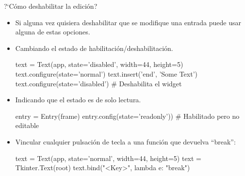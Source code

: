 \documentclass[10pt, envcountsect , spanish]{beamer}
\begin{document}
\begin{frame}[fragile]{?`Cómo deshabilitar la edición?}
\begin{itemize}
\item Si alguna vez quisiera deshabilitar que se modifique una entrada puede usar alguna de estas opciones.

\item Cambiando el estado de habilitación/deshabilitación.
\begin{pyverbatim}[][frame=single]
text = Text(app, state='disabled', width=44, height=5)
text.configure(state='normal')
text.insert('end', 'Some Text')
text.configure(state='disabled') # Deshabilita el widget
\end{pyverbatim}

\item Indicando que el estado es de solo lectura.
\begin{pyverbatim}[][frame=single]
entry = Entry(frame)
entry.config(state='readonly')) # Habilitado pero no editable
\end{pyverbatim}


\item Vincular cualquier pulsación de tecla a una función que devuelva  ``break'':
\begin{pyverbatim}[][frame=single]
text = Text(app, state='normal', width=44, height=5)
text = Tkinter.Text(root)
text.bind("<Key>", lambda e: "break")
\end{pyverbatim}
\end{itemize}
\end{frame}
\end{document}
